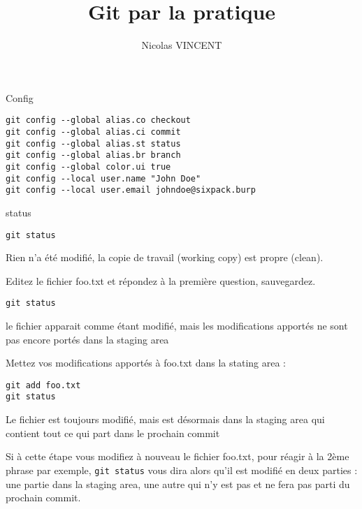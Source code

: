 \documentclass[10pt]{exam}
\title{Git par la pratique}
\author{Nicolas VINCENT}
\date{}
\begin{document}
 \maketitle
\thispagestyle{empty}
\begin{questions}



\question Config
\begin{lstlisting}
git config --global alias.co checkout
git config --global alias.ci commit
git config --global alias.st status
git config --global alias.br branch
git config --global color.ui true
git config --local user.name "John Doe"
git config --local user.email johndoe@sixpack.burp
\end{lstlisting}


\question status

\begin{lstlisting}
git status
\end{lstlisting}

Rien n'a été modifié, la copie de travail (working copy) est propre (clean).

Editez le fichier foo.txt et répondez à la première question, sauvegardez.

\begin{lstlisting}
git status
\end{lstlisting}

le fichier apparait comme étant modifié, mais les modifications apportés ne sont pas encore portés dans la staging area

Mettez vos modifications apportés à foo.txt dans la stating area :

\begin{lstlisting}
git add foo.txt
git status
\end{lstlisting}

Le fichier est toujours modifié, mais est désormais dans la staging area qui contient tout ce qui part dans le prochain commit

Si à cette étape vous modifiez à nouveau le fichier foo.txt, pour réagir à la 2ème phrase par exemple, \texttt{git status} vous dira alors qu'il est modifié en deux parties : une partie dans la staging area, une autre qui n'y est pas et ne fera pas parti du prochain commit.


\end{questions}
\end{document}
